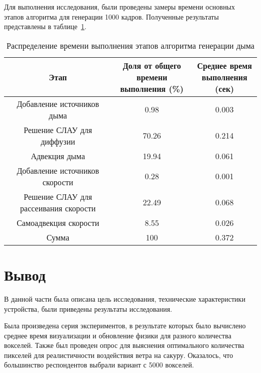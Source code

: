 Для выполнения исследования, были проведены замеры времени основных этапов алгоритма для генерации 1000 кадров. Полученные результаты представлены в таблице~\ref{tab:no_parallel}.

\begin{table}[H]
	\caption{Распределение времени выполнения этапов алгоритма генерации дыма}
	\label{tab:no_parallel}
	\centering
	\begin{tabular}{|c|c|c|}
		\hline
		Этап&\shortstack{Доля от общего\\времени выполнения (\%)}&\shortstack{Среднее время\\ выполнения (сек)}\\\hline
		Добавление источников дыма&0.98&0.003\\\hline
		Решение СЛАУ для диффузии &70.26&0.214\\\hline
		Адвекция дыма&19.94&0.061\\\hline
		Добавление источников скорости&0.28&0.001\\\hline
		Решение СЛАУ для рассеивания скорости&22.49&0.068\\\hline
		Самоадвекция скорости&8.55&0.026\\\hline\hline
		Сумма&100&	0.372\\\hline
	\end{tabular}
\end{table}



\section*{Вывод}
В данной части была описана цель исследования, технические характеристики устройства, были приведены результаты исследования.

Была произведена серия экспериментов, в результате которых было вычислено среднее время визуализации и обновление физики для разного количества вокселей. Также был проведен опрос для выяснения оптимального количества пикселей для реалистичности воздействия ветра на сакуру. Оказалось, что большинство респондентов выбрали вариант с 5000 вокселей.
